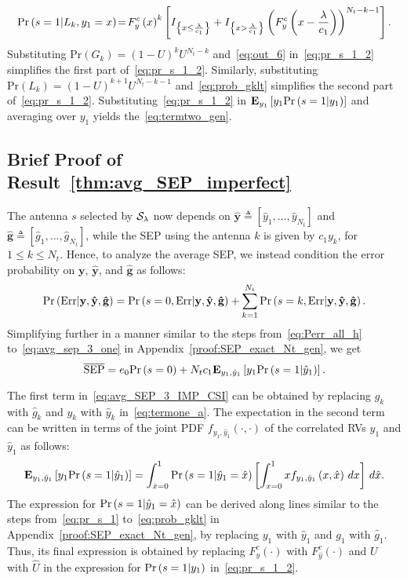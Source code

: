 \documentclass[12pt,draftcls,peerreview,onecolumn]{IEEEtran}
\newcommand{\brac}[1]{\left({#1}\right)}
\newcommand{\cbrac}[1]{\left\{{#1}\right\}}
\newcommand{\indic}[1]{I_{\cbrac{#1}}}
\newcommand{\define}{\triangleq}
\newcommand{\explow}[2]{{\bf{E}}_{#1}\left[{#2}\right]}
\newcommand{\prob}[1]{\text{Pr}\brac{#1}}
\newcommand{\given}{\arrowvert}
\newcommand{\SEP}{\text{SEP}}
\newcommand{\y}{\mathbf{y}}
\newcommand{\nx}{{0}}
\newcommand{\setG}{G}
\newcommand{\setL}{L}
\newcommand{\setGk}{\setG_k}
\newcommand{\setLk}{\setL_k}
\newcommand{\lam}{\lambda}
\newcommand{\Err}{{\text{Err}}}
\newcommand{\Nt}{{N_t}}
\newcommand{\puch}{g}
\newcommand{\gk}[1]{{\puch_{#1}}}
\newcommand{\ghatvec}{\mathbf{\hat{\puch}}}
\newcommand{\yhatvec}{\mathbf{\hat{y}}}
\newcommand{\cone}{c_{1}}
\newcommand{\lambym}{\frac{\lam}{\cone}}
\newcommand{\yk}[1]{y_{#1}}
\newcommand{\un}{U}
\newcommand{\zerosep}{e_0}
\newcommand{\callamrule}{{\cal S_{{\lam}}}}
\newcommand{\avgSEP}{\overline{\SEP}}
\newcommand{\unhat}{\widehat{\un}}
\newcommand{\ghat}{\hat{\puch}}
\newcommand{\yhat}{\hat{y}}
\newcommand{\gkhat}[1]{\ghat_{#1}}
\newcommand{\ykhat}[1]{\hat{y}_{#1}}
\newcommand{\ccdfyrv}[1]{ F^{c}_{y}\left(#1 \right) }
\newcommand{\ccdfyhatrv}[1]{F^{c}_{\yhat}\left(#1 \right) }
\newcommand{\xhat}{\hat{x}}
\begin{document}
\begin{equation}
\text{Pr}\brac{s =1\given \setLk,\yk{1}=x} \!=\! F_{y}^{c}\brac{x}^{k}\left[\indic{x\leq\lambym} +\indic{x>\lambym}\left( F_{y}^{c}\brac{x-\lambym}\right) ^{\Nt-k-1}\right].
\label{eq:prob_gklt}
\end{equation}
%
Substituting $\prob{\setGk} = \left(1-\un\right)^k\un^{\Nt-k}$ and~\eqref{eq:out_6} in~\eqref{eq:pr_s_1_2} simplifies the first part of~\eqref{eq:pr_s_1_2}. Similarly, substituting $\prob{\setLk}=\left(1-\un\right)^{k+1}\un^{\Nt-k-1}$ and~\eqref{eq:prob_gklt} simplifies the second part of~\eqref{eq:pr_s_1_2}. Substituting~\eqref{eq:pr_s_1_2} in $\explow{\yk{1}}{ \yk{1}\prob{s = 1\given \yk{1}}}$ and averaging over $\yk{1}$ yields the~\eqref{eq:termtwo_gen}. 


\subsection{Brief Proof of Result~\ref{thm:avg_SEP_imperfect}}
\label{proof:avg_SEP_imperfect_CSI}
The antenna $s$ selected by $\callamrule$  now depends on $\yhatvec\define\left[\ykhat{1},\ldots,\ykhat{\Nt} \right]$ and $\ghatvec\define\left[\gkhat{1},\ldots,\gkhat{\Nt} \right]$, while the SEP using the antenna $k$ is given by $\cone\yk{k}$, for $1\leq k\leq\Nt$.  Hence, to analyze the average SEP, we instead condition the error probability on $\y$, $\yhatvec$, and $\ghatvec$ as follows:
%
\begin{equation}
\prob{\Err \given \y,\yhatvec,\ghatvec} =  \prob{s=\nx,\Err\given \y, \yhatvec,\ghatvec} + \sum_{k=1}^{\Nt}\prob{s=k,\Err\given\y,\yhatvec,\ghatvec}.
\label{eq:Perr_all_imp_csi}
\end{equation}  
%
Simplifying further in a manner similar to the steps from~\eqref{eq:Perr_all_h} to~\eqref{eq:avg_sep_3_one} in Appendix~\ref{proof:SEP_exact_Nt_gen}, we get
%
\begin{equation}
\label{eq:avg_SEP_3_IMP_CSI}
\avgSEP = \zerosep \prob{s=\nx} + \Nt\cone\explow{\yk{1},\ykhat{1}}{\yk{1}\prob{s=1\given \ykhat{1}}}.
\end{equation}
%

The first term in~\eqref{eq:avg_SEP_3_IMP_CSI} can be obtained by replacing $\gk{k}$ with $\gkhat{k}$ and $\yk{k}$ with $\ykhat{k}$ in~\eqref{eq:termone_a}. The expectation in the second term can be written in terms of the joint PDF $f_{\yk{1},\ykhat{1}}\left(\cdot,\cdot\right)$ of the correlated RVs $\yk{1}$ and $\ykhat{1}$ as follows:
%
\begin{equation}
\label{eq:avg_SEP_4_IMP_CSI}
\explow{\yk{1},\ykhat{1}}{\yk{1}\prob{s=1\given \ykhat{1}}}= \int_{\xhat=0}^{1} \prob{s=1\given \ykhat{1}=\xhat} \left[ \int_{x=0}^{1} x  f_{\yk{1},\ykhat{1}}\left(x,\xhat\right)\,dx\right] \,d\xhat.
\end{equation}
%
The expression for $\prob{s=1\given\ykhat{1}=\xhat}$ can be derived along lines similar to the steps from~\eqref{eq:pr_s_1} to~\eqref{eq:prob_gklt} in Appendix~\ref{proof:SEP_exact_Nt_gen}, by replacing $\yk{1}$ with $\ykhat{1}$ and $\gk{1}$ with $\gkhat{1}$. Thus, its final expression is obtained by replacing $\ccdfyrv{\cdot}$ with $\ccdfyhatrv{\cdot}$ and $\un$  with $\unhat$ in the expression for  $\prob{s=1\given\yk{1}}$ in~\eqref{eq:pr_s_1_2}. 
\end{document}
